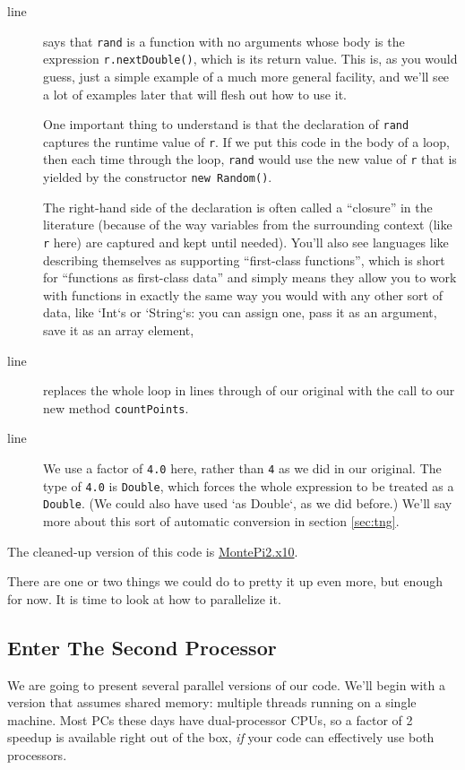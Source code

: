 \begin{description} 
\item[line ] says that {\tt rand} is a function with no arguments whose body
is the expression {\tt r.nextDouble()}, which is its return value.  This is, as you would guess,
just a simple example of a much more general facility, and we'll see a lot of 
examples later that will flesh out how to use it. 

One important thing to understand is that the declaration of {\tt rand} captures the
runtime value of {\tt r}.  If we put this code in the body of a loop, then each time through
the loop, {\tt rand} would use the new value of {\tt r} that is yielded by the constructor
{\tt new Random()}.

The right-hand side of the declaration is often called a
``closure'' in the literature (because of the way variables from the surrounding
context (like {\tt r} here) are captured and kept until needed).  You'll also
see languages like \Xten{} describing themselves as supporting 
``first-class functions'', which is short for ``functions as first-class
data'' and simply means they allow you to work with functions 
in exactly the same way you would with any other sort of data, like \xcd`Int`s
or \xcd`String`s: you
can assign one, pass it as an argument, save it as an array element, \etc{}

\item[line ] replaces the whole loop in lines
 through  of
our original with the call to our new method {\tt countPoints}.

\item[line ] We use a factor of {\tt 4.0} here, rather than {\tt 4} as we did
in our original. The type of {\tt 4.0} is {\tt Double}, which forces the whole
expression to be treated as a {\tt Double}.  
(We could also have used \xcd`as Double`, as we did before.)
We'll say more about this sort of
automatic conversion in section \ref{sec:tng}.
\end{description}  

The cleaned-up version of this code is
\href{http://dist.codehaus.org/x10/documentation/guide/src/montePi/MontePi2.x10}{MontePi2.x10}.

There are one or two things we could do to pretty it up even more, but enough
for now. It is time to look at how to parallelize it.
\subsection{Enter The Second Processor}\label{sec:esp}
We are going to present several parallel versions of our code.  We'll begin with
a version that assumes shared memory: multiple threads running on a single
machine.  Most PCs these days have
dual-processor CPUs, so a factor of 2 speedup is available right out of the box,
{\em if} your code can effectively use both processors.

